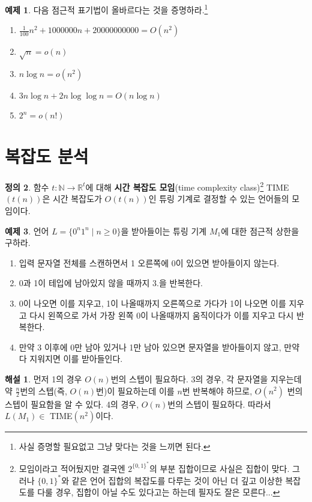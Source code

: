\documentclass[b5paper, 11pt]{book}
\theoremstyle{definition}
\newtheorem{defn}{정의}[chapter]
\newtheorem{ex}[defn]{예제}
\newtheorem*{ans*}{해설}
\begin{document}
\begin{ex}
    다음 점근적 표기법이 올바르다는 것을 증명하라.\footnote{사실 증명할 필요없고 그냥 맞다는 것을 느끼면 된다.}
    \begin{enumerate}
        \item $\frac{1}{100}n^2 + 1000000n + 20000000000 = O(n^2)$
        \item $\sqrt{n} = o(n)$
        \item $n\log{n} = o(n^2)$
        \item $3n\log{n} + 2n\log{\log{n}} = O(n\log{n})$
        \item $2^n = o(n!)$ 
    \end{enumerate}
\end{ex}
\section{복잡도 분석}\label{time complexity}
\begin{defn}
    함수 $t: \mathbb{N} \rightarrow \mathbb{R}^{t}$에 대해 \textbf{시간 복잡도 모임}(time complexity class)\footnote{모임이라고 적어뒀지만 결국엔 $2^{\{0,1\}^*}$의 부분 집합이므로 사실은 집합이 맞다. 그러나 $\{0,1\}^*$와 같은 언어 집합의 복잡도를 다루는 것이 아닌 더 깊고 이상한 복잡도를 다룰 경우, 집합이 아닐 수도 있다고는 하는데 필자도 잘은 모른다...} TIME$(t(n))$은 시간 복잡도가 $O(t(n))$인 튜링 기계로 결정할 수 있는 언어들의 모임이다. 
\end{defn}
\begin{ex}
    언어 $L = \{0^n1^n \;\vert\; n \ge 0\}$을 받아들이는 튜링 기계 $M_1$에 대한 점근적 상한을 구하라.
    \begin{enumerate}
        \item 입력 문자열 전체를 스캔하면서 1 오른쪽에 0이 있으면 받아들이지 않는다. 
        \item 0과 1이 테입에 남아있지 않을 때까지 3.을 반복한다. 
        \item 0이 나오면 이를 지우고, 1이 나올때까지 오른쪽으로 가다가 1이 
        나오면 이를 지우고 다시 왼쪽으로 가서 가장 왼쪽 0이 나올때까지 움직이다가 이를 지우고 다시 반복한다. 
        \item 만약 3 이후에 0만 남아 있거나 1만 남아 있으면 문자열을 받아들이지 않고, 만약 다 지워지면 이를 받아들인다. 
    \end{enumerate} 
\end{ex}
\begin{ans*}
먼저 1의 경우 $O(n)$번의 스텝이 필요하다. 3의 경우, 각 문자열을 지우는데 약 $\frac{n}{2}$번의 스텝(즉, $O(n)$번)이 필요하는데 이를 $n$번 반복해야 하므로, $O(n^2)$ 번의 스텝이 필요함을 알 수 있다. 4의 경우, $O(n)$번의 스텝이 필요하다. 따라서 $L(M_1) \in$ TIME$(n^2)$이다.
\end{ans*} 
\end{document}
